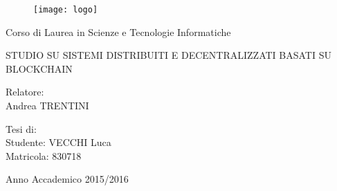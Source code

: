 \begin{titlepage}
	
	\begin{figure}
		\centering
		\texttt{[image: logo]}
		\vspace{0.5 cm}
	\end{figure}
	

\begin{center}
{\LARGE Corso di Laurea in Scienze e Tecnologie Informatiche}
\end{center}

\begin{center}
\vspace{3 cm}
{\Large \textsc{STUDIO SU SISTEMI DISTRIBUITI E DECENTRALIZZATI BASATI SU BLOCKCHAIN} }
\end{center}
\par
  \vspace{3 cm}
  
  \begin{flushleft}
  		 Relatore:\\ Andrea TRENTINI\\
  \end{flushleft}
  \vspace{1 cm}
  \begin{flushright}
  	Tesi di:\\ Studente: VECCHI Luca\\ Matricola: 830718
  \end{flushright}
    	  
\vfill
\begin{center}
	{\large Anno Accademico 2015/2016}
\end{center}
\end{titlepage}
